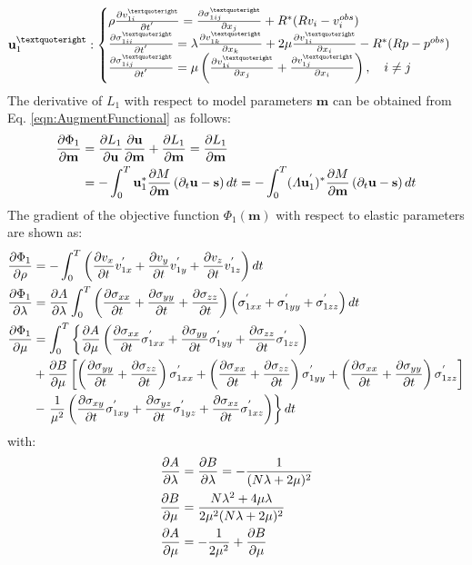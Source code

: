 \documentclass[pdftex,a4paper,parskip,listof=totoc,bibliography=totoc,onehalfspacing,12pt]{scrreprt}
\begin{document}
\begin{equation}
\label{eqn:AdjointEquation111}
\mathbf{u}_{1}^{’}:
\begin{cases}
\rho\pdv{v_{1i}^{’}}{t^{'}}=\pdv{\sigma_{1ij}^{’}}{x_j} + R^{*}(R v_i -v_i^{obs})\\
\pdv{\sigma_{1ii}^{’}}{t^{'}} = \lambda \pdv{v_{1k}^{’}}{x_k} + 2\mu \pdv{v_{1i}^{’}}{x_i} - R^{*}(R p - p^{obs})\\
\pdv{\sigma_{1ij}^{’}}{t^{'}} = \mu \left(\pdv{v_{1i}^{’}}{x_j} +\pdv{v_{1j}^{’}}{x_i}\right), \quad i \neq j
\end{cases}
\end{equation}
The derivative of $L_1$ with respect to model parameters $\mathbf{m}$ can be obtained from Eq. \ref{eqn:AugmentFunctional} as follows:
\begin{equation}
\begin{align}
 \pdv{\Phi_1}{\mathbf{m}} &= \pdv{L_1}{\mathbf{u}}\pdv{\mathbf{u}}{\mathbf{m}} + \pdv{L_1}{\mathbf{m}} =  \pdv{L_1}{\mathbf{m}} \\
 &= -\int_0^T \mathbf{u}_{1}^{*} \pdv{M}{\mathbf{m}} \left( \partial_{t}\mathbf{u} - \mathbf{s} \right) dt = -\int_0^T (\varLambda \mathbf{u}_{1}^{'})^{*} \pdv{M}{\mathbf{m}} \left( \partial_{t}\mathbf{u} - \mathbf{s} \right) dt
\end{align}
\end{equation}
The gradient of the objective function $\Phi_1(\mathbf{m})$ with respect to elastic parameters are shown as:
\begin{align}
 \pdv{\Phi_1}{\rho}&=-\int_0^T \left( \pdv{v_x}{t} v_{1x}^{'} + \pdv{v_y}{t} v_{1y}^{'} + \pdv{v_z}{t} v_{1z}^{'} \right) dt\\
 \pdv{\Phi_1}{\lambda}&=\pdv{A}{\lambda}\int_0^T  \left(\pdv{\sigma_{xx}}{t}+\pdv{\sigma_{yy}}{t}+\pdv{\sigma_{zz}}{t}\right) \left(\sigma_{1xx}^{'}+\sigma_{1yy}^{'}+\sigma_{1zz}^{'}\right)  dt\\
 \pdv{\Phi_1}{\mu}&=\int_0^T \left\{\pdv{A}{\mu}\left(\pdv{\sigma_{xx}}{t}\sigma_{1xx}^{'}+\pdv{\sigma_{yy}}{t}\sigma_{1yy}^{'}+\pdv{\sigma_{zz}}{t}\sigma_{1zz}^{'}\right)\right. \\
 &+ \pdv{B}{\mu} \left[\left(\pdv{\sigma_{yy}}{t}+\pdv{\sigma_{zz}}{t}\right)\sigma_{1xx}^{'}
 + \left(\pdv{\sigma_{xx}}{t}+\pdv{\sigma_{zz}}{t}\right)\sigma_{1yy}^{'}
  + \left(\pdv{\sigma_{xx}}{t}+\pdv{\sigma_{yy}}{t}\right)\sigma_{1zz}^{'}\right]\\
  &-\left.\frac{1}{\mu^2}\left(\pdv{\sigma_{xy}}{t}\sigma_{1xy}^{'}+\pdv{\sigma_{yz}}{t}\sigma_{1yz}^{'}+\pdv{\sigma_{xz}}{t}\sigma_{1xz}^{'}\right)\right\} dt
\end{align}
with:
\begin{align}
 \pdv{A}{\lambda}&=\pdv{B}{\lambda}=-\frac{1}{(N\lambda+2\mu)^2} \\
 \pdv{B}{\mu}&=\frac{N\lambda^2+4\mu\lambda}{2\mu^2(N\lambda+2\mu)^2} \\
 \pdv{A}{\mu}&=-\frac{1}{2\mu^2}+\pdv{B}{\mu}
\end{align}
\end{document}
